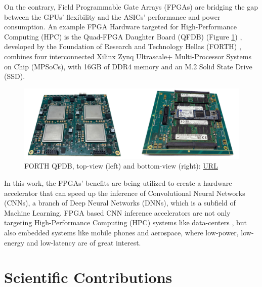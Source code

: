 On the contrary, Field Programmable Gate Arrays (FPGAs) are bridging the gap between the GPUs' flexibility and the ASICs' performance and power consumption. An example FPGA Hardware targeted for High-Performance Computing (HPC) is the Quad-FPGA Daughter Board (QFDB) (Figure \ref{fig:forth-qfdb-daughterboard}) \cite{Implementation-and-Impact-of-an-Ultra-Compact-Multi-FPGA-Board-for-Large-System-Prototyping}, developed by the Foundation of Research and Technology Hellas (FORTH) \cite{FORTH}, combines four interconnected Xilinx Zynq Ultrascale+ Multi-Processor Systems on Chip (MPSoCs), with 16GB of DDR4 memory and an M.2 Solid State Drive (SSD).

\begin{figure} [H]
	\centering
	\includegraphics[scale=0.22]{Images/Hardware/QFDB.png}
	\decoRule
	\caption[FORTH QFDB]{FORTH QFDB, top-view (left) and bottom-view (right): \href{https://ieeexplore.ieee.org/stamp/stamp.jsp?arnumber=8945720}{URL}}
	\label{fig:forth-qfdb-daughterboard}
\end{figure}

In this work, the FPGAs' benefits are being utilized to create a hardware accelerator that can speed up the inference of Convolutional Neural Networks (CNNs), a branch of Deep Neural Networks (DNNs), which is a subfield of Machine Learning. FPGA based CNN inference accelerators are not only targeting High-Performance Computing (HPC) systems like data-centers \cite{CNN-based-high-performance-computing-for-real-time-image-processing-on-GPU}, but also embedded systems \cite{MobileNets-Efficient-Convolutional-Neural-Networks-for-Mobile-Vision-Applications} like mobile phones and aerospace, where low-power, low-energy and low-latency are of great interest.

\section{Scientific Contributions}

